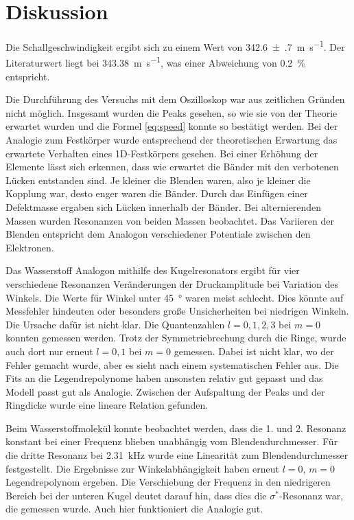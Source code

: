 \section{Diskussion}
\label{sec:Diskussion}

Die Schallgeschwindigkeit ergibt sich zu einem Wert von \SI{342.6(7)}{\meter\per\second}. Der Literaturwert liegt bei \SI{343.38}{\meter\per\second}, was einer Abweichung von \SI{0.2}{\percent} entspricht. 

Die Durchführung des Versuchs mit dem Oszilloskop war aus zeitlichen Gründen nicht möglich. 
Insgesamt wurden die Peaks gesehen, so wie sie von der Theorie erwartet wurden und die Formel \eqref{eq:speed} konnte so bestätigt werden. 
Bei der Analogie zum Festkörper wurde entsprechend der theoretischen Erwartung das erwartete Verhalten eines 1D-Festkörpers gesehen. Bei einer Erhöhung der Elemente lässt sich erkennen, dass wie erwartet die Bänder mit den verbotenen Lücken entstanden sind. Je kleiner die Blenden waren, also je kleiner die Kopplung war, desto enger waren die Bänder. 
Durch das Einfügen einer Defektmasse ergaben sich Lücken innerhalb der Bänder. 
Bei alternierenden Massen wurden Resonanzen von beiden Massen beobachtet.
Das Variieren der Blenden entspricht dem Analogon verschiedener Potentiale zwischen den Elektronen. 

Das Wasserstoff Analogon mithilfe des Kugelresonators ergibt für vier verschiedene Resonanzen Veränderungen der Druckamplitude bei Variation des Winkels. Die Werte für Winkel unter \SI{45}{\degree} waren meist schlecht. Dies könnte auf Messfehler hindeuten oder besonders große Unsicherheiten bei niedrigen Winkeln. Die Ursache dafür ist nicht klar. 
Die Quantenzahlen $l=0,1,2,3$ bei $m=0$ konnten gemessen werden. Trotz der Symmetriebrechung durch die Ringe, wurde auch dort nur erneut $l=0, 1$ bei $m=0$ gemessen. Dabei ist nicht klar, wo der Fehler gemacht wurde, aber es sieht nach einem systematischen Fehler aus.  
Die Fits an die Legendrepolynome haben ansonsten relativ gut gepasst und das Modell passt gut als Analogie. 
Zwischen der Aufspaltung der Peaks und der Ringdicke wurde eine lineare Relation gefunden. 

Beim Wasserstoffmolekül konnte beobachtet werden, dass die 1. und 2. Resonanz konstant bei einer Frequenz blieben unabhängig vom Blendendurchmesser. 
Für die dritte Resonanz bei \SI{2.31}{\kilo\hertz} wurde eine Linearität zum Blendendurchmesser festgestellt.
Die Ergebnisse zur Winkelabhängigkeit haben erneut $l=0$, $m=0$ Legendrepolynom ergeben. 
Die Verschiebung der Frequenz in den niedrigeren Bereich bei der unteren Kugel deutet darauf hin, dass dies die $\sigma^*$-Resonanz war, die gemessen wurde.
Auch hier funktioniert die Analogie gut. 


